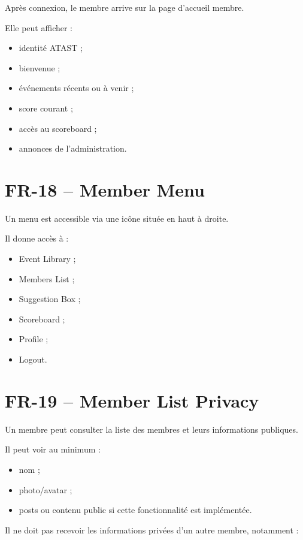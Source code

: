 \documentclass[11pt,a4paper]{report}
\begin{document}
Après connexion, le membre arrive sur la page d'accueil membre.

Elle peut afficher :

\begin{itemize}
    \item identité ATAST ;
    \item bienvenue ;
    \item événements récents ou à venir ;
    \item score courant ;
    \item accès au scoreboard ;
    \item annonces de l'administration.
\end{itemize}

\section{FR-18 -- Member Menu}

Un menu est accessible via une icône située en haut à droite.

Il donne accès à :

\begin{itemize}
    \item Event Library ;
    \item Members List ;
    \item Suggestion Box ;
    \item Scoreboard ;
    \item Profile ;
    \item Logout.
\end{itemize}

\section{FR-19 -- Member List Privacy}

Un membre peut consulter la liste des membres et leurs informations publiques.

Il peut voir au minimum :

\begin{itemize}
    \item nom ;
    \item photo/avatar ;
    \item posts ou contenu public si cette fonctionnalité est implémentée.
\end{itemize}

Il ne doit pas recevoir les informations privées d'un autre membre, notamment :
\end{document}
